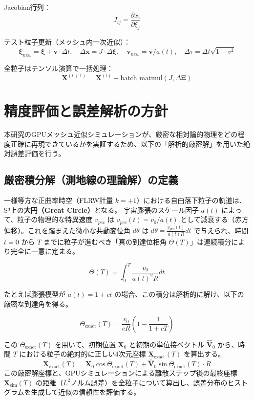 \documentclass[11pt]{ltjsarticle}
\begin{document}
Jacobian行列：
\[
J_{ij} = \frac{\partial x_i}{\partial \xi_j}
\]

テスト粒子更新（メッシュ内一次近似）：
\[
\mathbf{\xi}_{new} = \mathbf{\xi} + \mathbf{v} \cdot \Delta t, \quad
\Delta \mathbf{x} = J \cdot \Delta \mathbf{\xi}, \quad
\mathbf{v}_{new} = \mathbf{v} / a(t), \quad
\Delta \tau = \Delta t \sqrt{1 - v^2}
\]

全粒子はテンソル演算で一括処理：
\[
\mathbf{X}^{(t+1)} = \mathbf{X}^{(t)} + \text{batch\_matmul}(J, \Delta \mathbf{\Xi})
\]

\section{精度評価と誤差解析の方針}

本研究のGPUメッシュ近似シミュレーションが、厳密な相対論的物理をどの程度正確に再現できているかを実証するため、以下の「解析的厳密解」を用いた絶対誤差評価を行う。

\subsection{厳密積分解（測地線の理論解）の定義}
一様等方な正曲率時空（FLRW計量 $k=+1$）における自由落下粒子の軌道は、S³上の\textbf{大円（Great Circle）}となる。
宇宙膨張のスケール因子 $a(t)$ によって、粒子の物理的な特異速度 $v_{pec}$ は $v_{pec}(t) = v_0 / a(t)$ として減衰する（赤方偏移）。これを踏まえた微小な共動変位角 $d\theta$ は $d\theta = \frac{v_{pec}(t)}{a(t) R} dt$ で与えられ、時間 $t=0$ から $T$ までに粒子が進むべき「真の到達位相角 $\Theta(T)$」は連続積分により完全に一意に定まる。

\[
\Theta(T) = \int_0^T \frac{v_0}{a(t)^2 R} dt
\]

たとえば膨張模型が $a(t) = 1 + ct$ の場合、この積分は解析的に解け、以下の厳密な到達角を得る。

\[
\Theta_{\text{exact}}(T) = \frac{v_0}{c R} \left( 1 - \frac{1}{1 + cT} \right)
\]

この $\Theta_{\text{exact}}(T)$ を用いて、初期位置 $\mathbf{X}_0$ と初期の単位接ベクトル $\mathbf{\hat{V}}_0$ から、時間 $T$ における粒子の絶対的に正しい4次元座標 $\mathbf{X}_{\text{exact}}(T)$ を算出する。
\[
\mathbf{X}_{\text{exact}}(T) = \mathbf{X}_0 \cos \Theta_{\text{exact}}(T) + \mathbf{\hat{V}}_0 \sin \Theta_{\text{exact}}(T) \cdot R
\]
この厳密解座標と、GPUシミュレーションによる離散ステップ後の最終座標 $\mathbf{X}_{\text{sim}}(T)$ の距離（$L^2$ノルム誤差）を全粒子について算出し、誤差分布のヒストグラムを生成して近似の信頼性を評価する。
\end{document}
